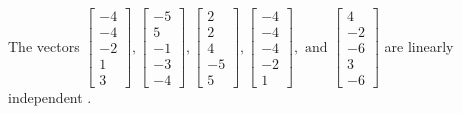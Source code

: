 \begin{exercise}
\begin{exerciseStatement}
  \end{exerciseStatement}
  \begin{exerciseAnswer}
   The vectors \(\left[\begin{array}{r}
-4 \\
-4 \\
-2 \\
1 \\
3
\end{array}\right] , \left[\begin{array}{r}
-5 \\
5 \\
-1 \\
-3 \\
-4
\end{array}\right] , \left[\begin{array}{r}
2 \\
2 \\
4 \\
-5 \\
5
\end{array}\right] , \left[\begin{array}{r}
-4 \\
-4 \\
-4 \\
-2 \\
1
\end{array}\right] , \text{ and } \left[\begin{array}{r}
4 \\
-2 \\
-6 \\
3 \\
-6
\end{array}\right]\) are 
  	 linearly independent  .
  


  \end{exerciseAnswer}
\end{exercise}